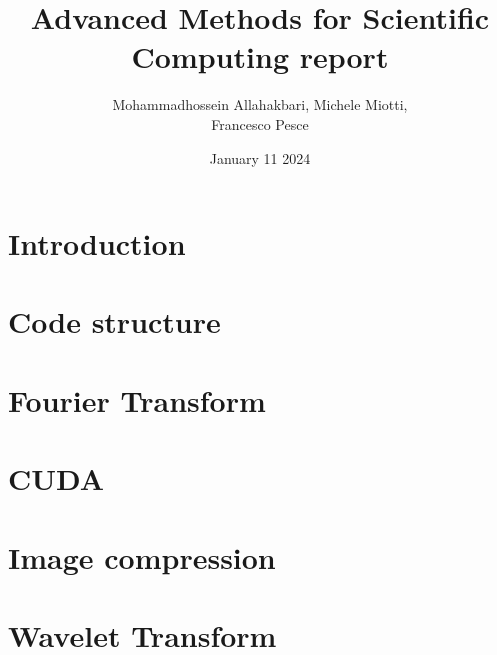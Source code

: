 \documentclass{article}
\title{Advanced Methods for Scientific Computing report}
\author{Mohammadhossein Allahakbari, Michele Miotti, \\Francesco Pesce}
\date{January 11 2024}
\begin{document}
\maketitle

\section{Introduction}
	

\section{Code structure}
	

\section{Fourier Transform}
	 

\section{CUDA}
	 

\section{Image compression}
	 

\section{Wavelet Transform}
	 


\end{document}
